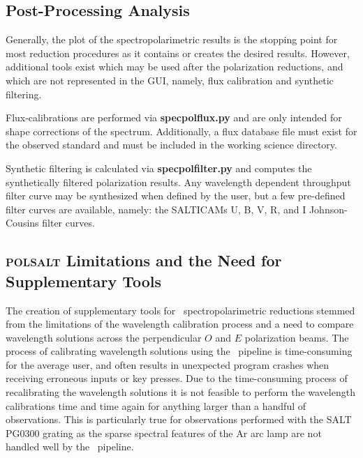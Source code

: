 \subsection{Post-Processing Analysis}

Generally, the plot of the spectropolarimetric results is the stopping point for most reduction procedures as it contains or creates the desired results. However, additional tools exist which may be used after the polarization reductions, and which are not represented in the \gls{GUI}, namely, flux calibration and synthetic filtering.

\pagebreak

Flux-calibrations are performed via \textbf{specpolflux.py} and are only intended for shape corrections of the spectrum. Additionally, a flux database file must exist for the observed standard and must be included in the working science directory.

Synthetic filtering is calculated via \textbf{specpolfilter.py} and computes the synthetically filtered polarization results.
Any wavelength dependent throughput filter curve may be synthesized when defined by the user, but a few pre-defined filter curves are available, namely: the \glspl{SALTICAM} \gls{U}, \gls{B}, \gls{V}, \gls{R}, and \gls{I} Johnson-Cousins filter curves.

\subsection{\textsc{polsalt} Limitations and the Need for Supplementary Tools} \label{subsec:polsalt_limits}

The creation of supplementary tools for \polsalt\ spectropolarimetric reductions stemmed from the limitations of the wavelength calibration process and a need to compare wavelength solutions across the perpendicular $O$ and $E$ polarization beams. The process of calibrating wavelength solutions using the \polsalt\ pipeline is time-consuming for the average user, and often results in unexpected program crashes when receiving erroneous inputs or key presses. Due to the time-consuming process of recalibrating the wavelength solutions it is not feasible to perform the wavelength calibrations time and time again for anything larger than a handful of observations. This is particularly true for observations performed with the \gls{SALT} PG$0300$ grating as the sparse spectral features of the \gls{Ar} arc lamp are not handled well by the \polsalt\ pipeline.

